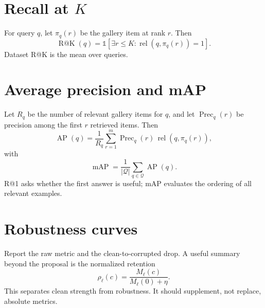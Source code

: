 \documentclass[11pt,oneside,openany]{book}
\theoremstyle{myplain}
\theoremstyle{definition}
\newcommand{\ind}{\mathds{1}}
\newcommand{\card}[1]{\left|#1\right|}
\begin{document}
\section{Recall at $K$}

For query $q$, let $\pi_q(r)$ be the gallery item at rank $r$. Then
\begin{equation}
  \operatorname{R@K}(q)=
  \ind\left[\exists r\le K:\operatorname{rel}(q,\pi_q(r))=1\right].
  \label{eq:recallk}
\end{equation}
Dataset R@K is the mean over queries.

\section{Average precision and mAP}

Let $R_q$ be the number of relevant gallery items for $q$, and let $\operatorname{Prec}_q(r)$ be precision among the first $r$ retrieved items. Then
\begin{equation}
  \operatorname{AP}(q)=\frac{1}{R_q}
  \sum_{r=1}^{m}\operatorname{Prec}_q(r)\,
  \operatorname{rel}(q,\pi_q(r)),
  \label{eq:ap}
\end{equation}
with
\begin{equation}
  \operatorname{mAP}=\frac{1}{\card{\mathcal Q}}
  \sum_{q\in\mathcal Q}\operatorname{AP}(q).
  \label{eq:map}
\end{equation}
R@1 asks whether the first answer is useful; mAP evaluates the ordering of all relevant examples.

\section{Robustness curves}

Report the raw metric and the clean-to-corrupted drop. A useful summary beyond the proposal is the normalized retention
\begin{equation}
  \rho_\ell(c)=\frac{M_\ell(c)}{M_\ell(0)+\eta}.
  \label{eq:retention}
\end{equation}
This separates clean strength from robustness. It should supplement, not replace, absolute metrics.
\end{document}
